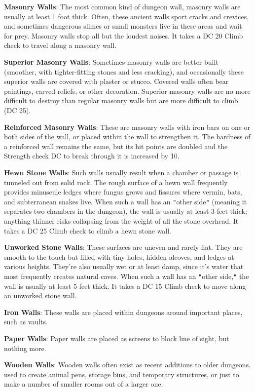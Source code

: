 				
\textbf{Masonry Walls}: The most common kind of dungeon wall, masonry walls are usually at least 1 foot thick. Often, these ancient walls sport cracks and crevices, and sometimes dangerous slimes or small monsters live in these areas and wait for prey. Masonry walls stop all but the loudest noises. It takes a DC 20 Climb check to travel along a masonry wall.
				
\textbf{Superior Masonry Walls}: Sometimes masonry walls are better built (smoother, with tighter-fitting stones and less cracking), and occasionally these superior walls are covered with plaster or stucco. Covered walls often bear paintings, carved reliefs, or other decoration. Superior masonry walls are no more difficult to destroy than regular masonry walls but are more difficult to climb (DC 25).
				
\textbf{Reinforced Masonry Walls}: These are masonry walls with iron bars on one or both sides of the wall, or placed within the wall to strengthen it. The hardness of a reinforced wall remains the same, but its hit points are doubled and the Strength check DC to break through it is increased by 10.
				
\textbf{Hewn Stone Walls}: Such walls usually result when a chamber or passage is tunneled out from solid rock. The rough surface of a hewn wall frequently provides minuscule ledges where fungus grows and fissures where vermin, bats, and subterranean snakes live. When such a wall has an \texttt{{}"{}}other side\texttt{{}"{}} (meaning it separates two chambers in the dungeon), the wall is usually at least 3 feet thick; anything thinner risks collapsing from the weight of all the stone overhead. It takes a DC 25 Climb check to climb a hewn stone wall.
				
\textbf{Unworked Stone Walls}: These surfaces are uneven and rarely flat. They are smooth to the touch but filled with tiny holes, hidden alcoves, and ledges at various heights. They're also usually wet or at least damp, since it's water that most frequently creates natural caves. When such a wall has an \texttt{{}"{}}other side,\texttt{{}"{}} the wall is usually at least 5 feet thick. It takes a DC 15 Climb check to move along an unworked stone wall. 
				
\textbf{Iron Walls}: These walls are placed within dungeons around important places, such as vaults. 
				
\textbf{Paper Walls}: Paper walls are placed as screens to block line of sight, but nothing more.
				
\textbf{Wooden Walls}: Wooden walls often exist as recent additions to older dungeons, used to create animal pens, storage bins, and temporary structures, or just to make a number of smaller rooms out of a larger one.
				
